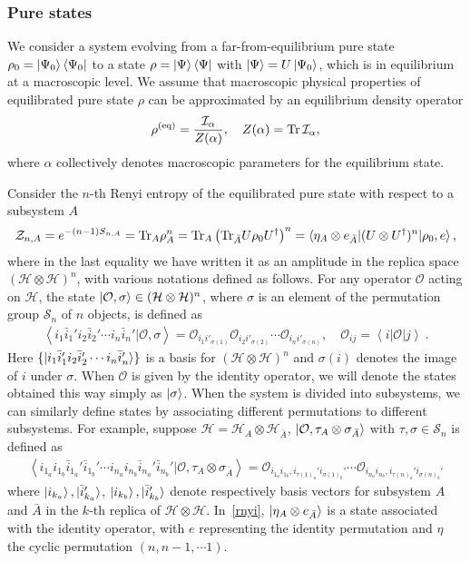 \documentclass[a4paper,11pt]{article}
\newcommand\vev[1]{{\ensuremath{\left\langle{#1}\right\rangle}}}
\newcommand{\be}{\begin{equation}}
\newcommand{\ee}{\end{equation}}
\newcommand{\bega}{\begin{gather}}
\newcommand\al{{\alpha}}
\newcommand\sig{\sigma}
\newcommand\da{{\dagger}}
\def\le{\left}
\def\ri{\right}
\newcommand\sH{{\ensuremath{{\mathcal H}}}}
\newcommand\sO{{\ensuremath{{\mathcal O}}}}
\newcommand\sS{{\mathcal S}}
\newcommand\sZ{{\mathcal Z}}
\newcommand{\Tr}{\text{Tr}}
\begin{document}
\subsubsection{Pure states} 

We consider a system evolving from a far-from-equilibrium pure state $\rho_0 = \ket{\Psi_0} \bra{\Psi_0}$ to 
a state $\rho = \ket{\Psi} \bra{\Psi}$ with $\ket{\Psi} = U \ket{\Psi_0}$, which is in equilibrium at a macroscopic level. We assume that macroscopic physical properties of equilibrated pure state $\rho$ can be approximated by an equilibrium density operator 
\begin{align} \label{eqd} 
 \rho^{(\rm eq)} = \frac{\mathcal{I}_{\alpha}}{Z(\alpha)}, \quad Z(\alpha) = \Tr\, \mathcal{I}_{\alpha} ,
\end{align}
where $\al$ collectively denotes macroscopic parameters for the equilibrium state. 

Consider the $n$-th Renyi entropy of the equilibrated pure state with respect to a subsystem $A$ 
\be \label{rnyi}
\sZ_{n,A} = e^{- (n-1) S_{n,A}} = {\rm Tr}_A \rho_A^n = {\rm Tr}_A \le({\rm Tr}_{\bar A} U \rho_0 U^\da \ri)^n 
= \braket{\eta_A \otimes e_{\bar A}| (U \otimes U^{\dagger})^n| \rho_0,e},
\ee
where in the last equality we have written it as an amplitude in the replica space $(\sH \otimes \sH)^n$, with various notations defined as follows. 
For any operator $\sO$ acting on $\sH$, the state $\ket{\sO, \sig} \in (\sH \otimes \sH)^n$, where $\sig$ is an element of the permutation group $\sS_n$ of $n$ objects, is defined as 
\bega \label{aa1}
\vev{i_1 \bar i_1' i_2 \bar i_2' \cdots i_n \bar i_n'| \sO, \sig} = \sO_{i_1 i'_{\sig (1)}} \sO_{i_2 i'_{\sig (2)}} \cdots 
\sO_{i_n i'_{\sig (n)}} , \quad \sO_{ij} = \vev{i |\sO|j} \ .
\end{gather} 
Here $\{\ket{i_1 \bar i_1' i_2 \bar i_2' \cdots i_n \bar i_n'}\}$ is a 
basis for $(\sH \otimes \sH)^{n}$ and $\sig (i)$ denotes the image of $i$ under $\sig$. 
When $\sO$ is given by the identity operator, we will denote the states obtained this way simply as $\ket{\sig}$. 
When the system is divided into subsystems, we can similarly define states by associating different permutations to different subsystems. For example, suppose $\sH = \sH_A \otimes \sH_{\bar A}$, $\ket{\sO, \tau_A \otimes \sig_{\bar A}}$ with $\tau, \sig \in \sS_n$ is defined as 
\bega 
 \vev{i_{1_a} i_{1_b} \bar i_{1_a}' \bar i_{1_b}' \cdots i_{n_a} i_{n_b} \bar i_{n_a}' \bar i_{n_b}' |\sO, \tau_A \otimes \sig_{\bar A}} = 
 \sO_{i_{1_a} i_{1_b}, i_{\tau(1)_a}' i_{\sig(1)_b}'} \cdots \sO_{i_{n_a} i_{n_b}, i_{\tau(n)_a}' i_{\sig(n)_b}'} 
\label{zn_t}
\end{gather}
where $\ket{i_{k_a}}, \ket{\bar i'_{k_a}}$, $\ket{i_{k_b}}, \ket{\bar i'_{k_b}}$ denote respectively basis vectors for subsystem $A$ and $\bar A$ in the $k$-th replica of $\sH \otimes \sH$.
In~\eqref{rnyi}, $\ket{\eta_A \otimes e_{\bar A}}$ is a state associated with the identity operator, with $e$ representing the identity permutation and $\eta$ the cyclic permutation $(n, n-1, \cdots 1)$. 
\end{document}
